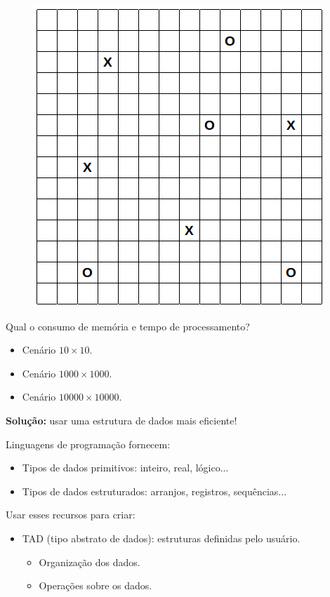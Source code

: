 \begin{figure}[H]
	\centering
	\includegraphics[width=0.6\linewidth]{img/cenario}
\end{figure}

{\color{redtext}
Qual o consumo de memória e tempo de processamento?
\begin{itemize}
	\item Cenário $10 \times 10$.
	\item Cenário $1000 \times 1000$.
	\item Cenário $10000 \times 10000$.
\end{itemize}
}


\textbf{Solução:} usar uma estrutura de dados mais eficiente!

\clearpage

Linguagens de programação fornecem:
\begin{itemize}
	\item Tipos de dados primitivos: inteiro, real, lógico...
	\item Tipos de dados estruturados: arranjos, registros, sequências...
\end{itemize}

\medskip

Usar esses recursos para criar:
\begin{itemize}
	\item TAD (tipo abstrato de dados): estruturas definidas pelo usuário.
	\begin{itemize}
		\item Organização dos dados.
		\item Operações sobre os dados.
	\end{itemize}
\end{itemize}


